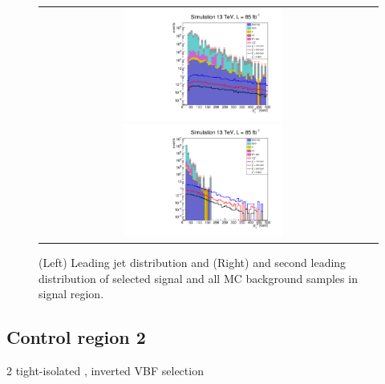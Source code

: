 \begin{figure}[tbh!]
	\centering
	\begin{tabular}{cc}
		\includegraphics[width=0.5\textwidth]{analysis/pics/h_jet1pt_Taui2TightIso.pdf}
		\includegraphics[width=0.5\textwidth]{analysis/pics/h_tau2pt_Taui2TightIso.pdf}
	\end{tabular}
	\caption{(Left) Leading jet \pt distribution and (Right) and second leading \hadtau \pt distribution of selected signal and all MC background samples in signal region.}
	\label{fig::crplots2_Taui2TightIso_13tev}
\end{figure}

\subsection*{Control region 2}

\FloatBarrier

2 tight-isolated \hadtau, inverted VBF selection

